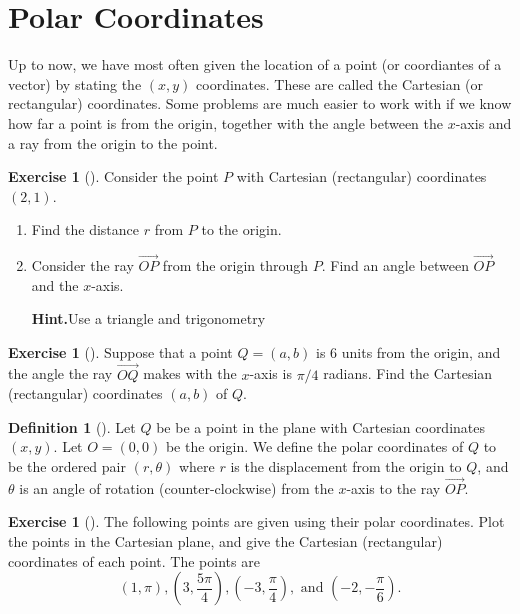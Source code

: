 \documentclass[10pt,]{book}
\theoremstyle{plain}
\theoremstyle{definition}
\newtheorem{definition}[theorem]{Definition}
\theoremstyle{definition}
\theoremstyle{definition}
\theoremstyle{definition}
\newtheorem{exploration}[project]{Exercise}
\theoremstyle{definition}
\numberwithin{equation}{section}
\newcommand{\ds}{\displaystyle}
\begin{document}
\section[{Polar Coordinates}]{Polar Coordinates}\label{ch05_01_polar_coordinates}
Up to now, we have most often given the location of a point (or coordiantes of a vector) by stating the \((x,y)\) coordinates. These are called the Cartesian (or rectangular) coordinates. Some problems are much easier to work with if we know how far a point is from the origin, together with the angle between the \(x\)-axis and a ray from the origin to the point.%
\begin{exploration}[]\label{exploration-83}
Consider the point \(P\) with Cartesian (rectangular) coordinates \((2,1)\).%
\begin{enumerate}[font=\bfseries,label=(\alph*),ref=\alph*]
\item\label{task-138} Find the distance \(r\) from \(P\) to the origin.%
\item\label{task-139} Consider the ray \(\stackrel{\rightarrow}{OP}\) from the origin through \(P\). Find an angle between \(\vec{OP}\) and the \(x\)-axis.%
\par\medskip\noindent%
\textbf{Hint.}\quad Use a triangle and trigonometry%
\end{enumerate}
\end{exploration}
\begin{exploration}[]\label{exploration-84}
Suppose that a point \(Q=(a,b)\) is 6 units from the origin, and the angle the ray \(\vec{OQ}\) makes with the \(x\)-axis is \(\pi/4\) radians. Find the Cartesian (rectangular) coordinates \((a,b)\) of \(Q\).%
\end{exploration}
\begin{definition}[{}]\label{definition-21}
Let \(Q\) be be a point in the plane with Cartesian coordinates \((x,y)\). Let \(O=(0,0)\) be the origin. We define the polar coordinates of \(Q\) to be the ordered pair \((r,\theta)\) where \(r\) is the displacement from the origin to \(Q\), and \(\theta\) is an angle of rotation (counter-clockwise) from the \(x\)-axis to the ray \(\vec {OP}\).%
\end{definition}
\begin{exploration}[]\label{exploration-85}
The following points are given using their polar coordinates. Plot the points in the Cartesian plane, and give the Cartesian (rectangular) coordinates of each point. The points are%
\begin{equation*}
(1,\pi), 
\ds \left( 3,\frac{5\pi}{4}\right),
\ds \left( -3,\frac{\pi}{4}\right),\text{ and } 
\ds \left( -2,-\frac{\pi}{6}\right).
\end{equation*}
%
\end{exploration}
\end{document}
